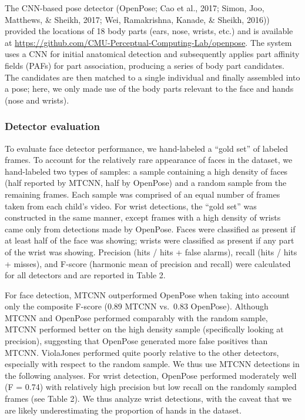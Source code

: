 \documentclass[10pt, letterpaper]{article}
\begin{document}
The CNN-based pose detector (OpenPose; Cao et al., 2017; Simon, Joo,
Matthews, \& Sheikh, 2017; Wei, Ramakrishna, Kanade, \& Sheikh, 2016))
provided the locations of 18 body parts (ears, nose, wrists, etc.) and
is available at
\url{https://github.com/CMU-Perceptual-Computing-Lab/openpose}. The
system uses a CNN for initial anatomical detection and subsequently
applies part affinity fields (PAFs) for part association, producing a
series of body part candidates. The candidates are then matched to a
single individual and finally assembled into a pose; here, we only made
use of the body parts relevant to the face and hands (nose and wrists).

\subsubsection{Detector evaluation}\label{detector-evaluation}

To evaluate face detector performance, we hand-labeled a ``gold set'' of
labeled frames. To account for the relatively rare appearance of faces
in the dataset, we hand-labeled two types of samples: a sample
containing a high density of faces (half reported by MTCNN, half by
OpenPose) and a random sample from the remaining frames. Each sample was
comprised of an equal number of frames taken from each child's video.
For wrist detections, the ``gold set'' was constructed in the same
manner, except frames with a high density of wrists came only from
detections made by OpenPose. Faces were classified as present if at
least half of the face was showing; wrists were classified as present if
any part of the wrist was showing. Precision (hits / hits + false
alarms), recall (hits / hits + misses), and F-score (harmonic mean of
precision and recall) were calculated for all detectors and are reported
in Table 2.

For face detection, MTCNN outperformed OpenPose when taking into account
only the composite F-score (0.89 MTCNN vs.~0.83 OpenPose). Although
MTCNN and OpenPose performed comparably with the random sample, MTCNN
performed better on the high density sample (specifically looking at
precision), suggesting that OpenPose generated more false positives than
MTCNN. ViolaJones performed quite poorly relative to the other
detectors, especially with respect to the random sample. We thus use
MTCNN detections in the following analyses. For wrist detection,
OpenPose performed moderately well (F = 0.74) with relatively high
precision but low recall on the randomly sampled frames (see Table 2).
We thus analyze wrist detections, with the caveat that we are likely
underestimating the proportion of hands in the dataset.
\end{document}
